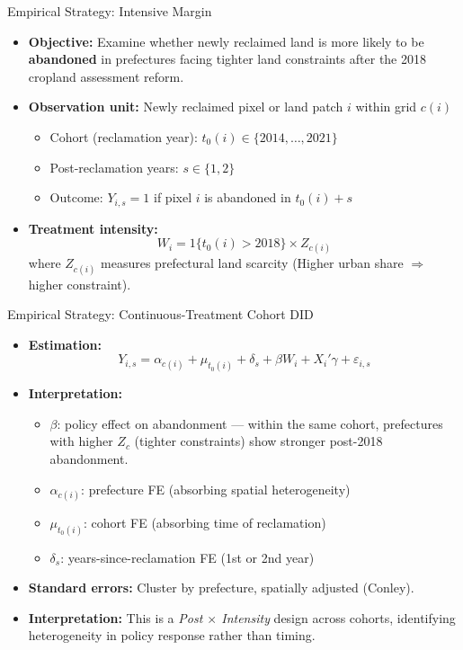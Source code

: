 \documentclass[10pt, xcolor=x11names,compress, aspectratio=169]{beamer}
\begin{document}
\begin{frame}{Empirical Strategy: Intensive Margin}
\begin{itemize}
    \item \textbf{Objective:} Examine whether newly reclaimed land is more likely to be \textbf{abandoned} in prefectures facing tighter land constraints after the 2018 cropland assessment reform.
    \vspace{0.5em}
    \item \textbf{Observation unit:} Newly reclaimed pixel or land patch $i$ within grid $c(i)$
    \begin{itemize}
        \item Cohort (reclamation year): $t_0(i) \in \{2014, \ldots, 2021\}$
        \item Post-reclamation years: $s \in \{1,2\}$
        \item Outcome: $Y_{i,s}=1$ if pixel $i$ is abandoned in $t_0(i)+s$
    \end{itemize}
    \vspace{0.5em}
    \item \textbf{Treatment intensity:}
    \[
        W_i = 1\{t_0(i)>2018\} \times Z_{c(i)}
    \]
    where $Z_{c(i)}$ measures prefectural land scarcity (Higher urban share $\Rightarrow$ higher constraint).
\end{itemize}
\end{frame}

\begin{frame}{Empirical Strategy: Continuous-Treatment Cohort DID}
\begin{itemize}
    \item \textbf{Estimation:}
    \[
        Y_{i,s} = \alpha_{c(i)} + \mu_{t_0(i)} + \delta_s 
        + \beta W_i + X_{i}'\gamma + \varepsilon_{i,s}
    \]
    \vspace{0.5em}
    \item \textbf{Interpretation:}
    \begin{itemize}
        \item $\beta$: policy effect on abandonment --- 
        within the same cohort, prefectures with higher $Z_c$ (tighter constraints) show stronger post-2018 abandonment.
        \item $\alpha_{c(i)}$: prefecture FE (absorbing spatial heterogeneity)
        \item $\mu_{t_0(i)}$: cohort FE (absorbing time of reclamation)
        \item $\delta_s$: years-since-reclamation FE (1st or 2nd year)
    \end{itemize}
    \vspace{0.5em}
    \item \textbf{Standard errors:} Cluster by prefecture, spatially adjusted (Conley).
    \item \textbf{Interpretation:} This is a \emph{Post $\times$ Intensity} design across cohorts, identifying heterogeneity in policy response rather than timing.
\hyperlink{overview}{}
\end{itemize}
\end{frame}
\end{document}
